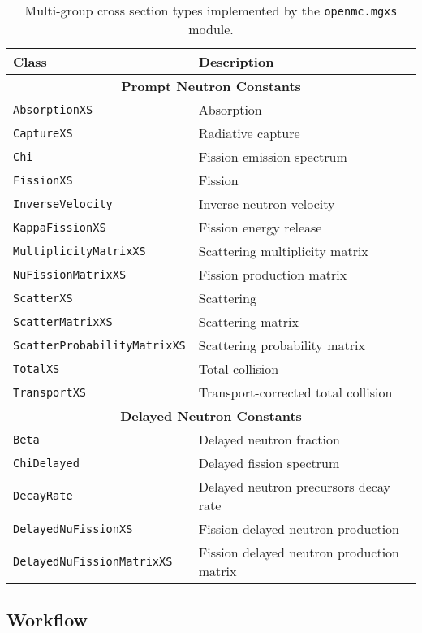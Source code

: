 \begin{table}[h!]
  \centering
  \caption{Multi-group cross section types implemented by the \texttt{openmc.mgxs} module.}
  \small
  \label{tab:mgxs-types}
  \vspace{6pt}
  \begin{tabular}{l l}
  \toprule
  \textbf{Class} &
  \textbf{Description} \\
  \midrule
  \multicolumn{2}{c}{\bf Prompt Neutron Constants} \\
  \midrule
  \texttt{AbsorptionXS} & Absorption \\
  \texttt{CaptureXS} & Radiative capture \\
  \texttt{Chi} & Fission emission spectrum \\
  \texttt{FissionXS} & Fission \\
  \texttt{InverseVelocity} & Inverse neutron velocity \\
  \texttt{KappaFissionXS} & Fission energy release \\
  \texttt{MultiplicityMatrixXS} & Scattering multiplicity matrix \\
  \texttt{NuFissionMatrixXS} & Fission production matrix \\
  \texttt{ScatterXS} & Scattering \\
  \texttt{ScatterMatrixXS} & Scattering matrix \\
  \texttt{ScatterProbabilityMatrixXS} & Scattering probability matrix \\
  \texttt{TotalXS} & Total collision \\
  \texttt{TransportXS} & Transport-corrected total collision \\
  \midrule
  \multicolumn{2}{c}{\bf Delayed Neutron Constants} \\
  \midrule
  \texttt{Beta} & Delayed neutron fraction \\
  \texttt{ChiDelayed} & Delayed fission spectrum \\
  \texttt{DecayRate} & Delayed neutron precursors decay rate \\
  \texttt{DelayedNuFissionXS} & Fission delayed neutron production \\
  \texttt{DelayedNuFissionMatrixXS} & Fission delayed neutron production matrix \\
  \bottomrule
\end{tabular}
\end{table}


\subsection{Workflow}
\label{subsec:workflow}

